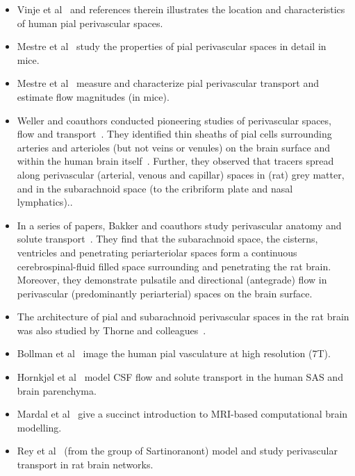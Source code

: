 \documentclass[fleqn,10pt]{wlscirep}
\begin{document}
\begin{itemize}
\item Vinje et al~\cite{vinje2021brain} and references therein illustrates the location and characteristics of human pial perivascular spaces.
\item Mestre et al~\cite{mestre2022periarteriolar} study the properties of pial perivascular spaces in detail in mice.
\item Mestre et al~\cite{mestre2018flow} measure and characterize pial perivascular transport and estimate flow magnitudes (in mice).
\item
  Weller and coauthors conducted pioneering studies of perivascular spaces, flow and transport~\cite{zhang1990interrelationships, zhang1992directional}. They identified thin sheaths of pial cells surrounding arteries and arterioles (but not veins or venules) on the brain surface and within the human brain itself~\cite{zhang1990interrelationships}. Further, they observed that tracers spread along perivascular (arterial, venous and capillar) spaces in (rat) grey matter, and in the subarachnoid space (to the cribriform plate and nasal lymphatics)..   
\item In a series of papers, Bakker and coauthors study perivascular anatomy and solute transport~\cite{bedussi2017paravascular, bedussi2018paravascular}. They find that the subarachnoid space, the cisterns, ventricles and penetrating periarteriolar spaces form a continuous cerebrospinal-fluid filled space surrounding and penetrating the rat brain\cite{bedussi2017paravascular}. Moreover, they demonstrate pulsatile and directional (antegrade) flow in perivascular (predominantly periarterial) spaces on the brain surface.
\item
  The architecture of pial and subarachnoid perivascular spaces in the rat brain was also studied by Thorne and colleagues~\cite{pizzo2018intrathecal, hannocks2018molecular}.
\item Bollman et al~\cite{bollmann2022imaging} image the human pial vasculature at high resolution (7T).
\item Hornkjøl et al~\cite{hornkjol2022csf} model CSF flow and solute transport in the human SAS and brain parenchyma. 
\item Mardal et al~\cite{mardal2022mathematical} give a succinct introduction to MRI-based computational brain modelling. 
\item
  Rey et al~\cite{rey2023perivascular} (from the group of Sartinoranont) model and study perivascular transport in rat brain networks.
\end{itemize}
\end{document}
